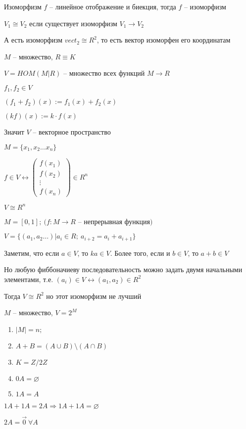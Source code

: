 \documentclass[12pt]{article}
\begin{document}
\begin{defin}{Изоморфизм}
    $f$ -- линейное отображение и биекция, тогда $f$ -- изоморфизм

    $V_1 \cong V_2$ если существует изоморфизм $V_1 \rightarrow V_2$

    А есть изоморфизм $vect_2 \cong R^2$, то есть вектор изоморфен его координатам 
\end{defin}

\begin{Example}{}
    $M$ -- множество, $R \equiv K$

    $V = HOM(M | R)$ -- множество всех функций $M \rightarrow R$

    $f_1, f_2 \in V$

    $(f_1 + f_2)(x) := f_1(x) + f_2(x)$

    $(kf)(x) := k \cdot f(x)$

    Значит $V$ -- векторное пространство

\begin{Example}{}
    $M = \{x_1, x_2 \ldots x_n\}$

    $f \in V \leftrightarrow \left( \begin{gathered}
        f(x_1) \\
        f(x_2) \\
        \vdots \\
        f(x_n)
    \end{gathered} \right) \in R^n$

    $V \cong R^n$

    $M = [0, 1];\ (f : M \rightarrow R$ -- непрерывная функция$)$
\end{Example}

\end{Example}

\begin{Example}{}
    $V = \{(a_1, a_2 \ldots) | a_i \in R;\ a_{i + 2} = a_i + a_{i + 1}\}$

    Заметим, что если $a \in V$, то $ka \in V$. Более того, если и $b \in V$, то $a + b \in V$

    Но любую фиббоначиеву последовательность можно задать двумя начальными элементами, т.е. $(a_i) \in V \leftrightarrow (a_1, a_2) \in R^2$

    Тогда $V \cong R^2$ но этот изоморфизм не лучший
\end{Example}

\begin{Example}{}
    $M$ -- множество, $V = 2^M$

    \begin{enumerate}
        \item $|M| = n;$
        \item $A + B = (A \cup B) \setminus (A \cap B)$
        \item $K = Z/2Z$
        \item $0A = \varnothing$
        \item $1A = A$
    \end{enumerate}

    $1A + 1A = 2A \Rightarrow 1A + 1A = \varnothing$

    $2A = \overrightarrow{0}\ \forall A$
\end{Example}
\end{document}

